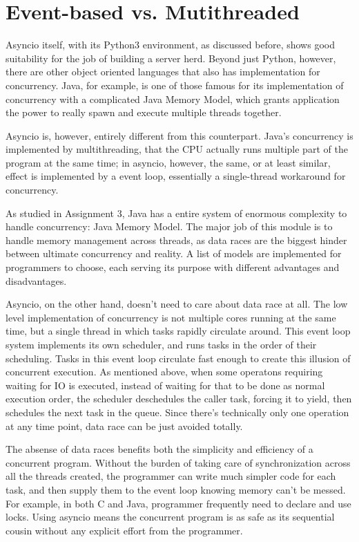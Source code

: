 \documentclass[letterpaper,twocolumn,10pt]{article}
\begin{document}
\section{Event-based vs. Mutithreaded}

Asyncio itself, with its Python3 environment, as discussed before, shows good suitability for the job of building a server herd.
Beyond just Python, however, there are other object oriented languages that also has implementation for concurrency.
Java, for example, is one of those famous for its implementation of concurrency with a complicated Java Memory Model, which grants application the power to really spawn and execute multiple threads together.

Asyncio is, however, entirely different from this counterpart.
Java's concurrency is implemented by multithreading, that the CPU actually runs multiple part of the program at the same time;
in asyncio, however, the same, or at least similar, effect is implemented by a event loop, essentially a single-thread workaround for concurrency.

As studied in Assignment 3, Java has a entire system of enormous complexity to handle concurrency: Java Memory Model. 
The major job of this module is to handle memory management across threads, as data races are the biggest hinder between ultimate concurrency and reality. 
A list of models are implemented for programmers to choose, each serving its purpose with different advantages and disadvantages.

Asyncio, on the other hand, doesn't need to care about data race at all.
The low level implementation of concurrency is not multiple cores running at the same time, but a single thread in which tasks rapidly circulate around.
This event loop system implements its own scheduler, and runs tasks in the order of their scheduling.
Tasks in this event loop circulate fast enough to create this illusion of concurrent execution.
As mentioned above, when some operatons requiring waiting for IO is executed, instead of waiting for that to be done as normal execution order, the scheduler deschedules the caller task, forcing it to yield, then schedules the next task in the queue.
Since there's technically only one operation at any time point, data race can be just avoided totally.

The absense of data races benefits both the simplicity and efficiency of a concurrent program.
Without the burden of taking care of synchronization across all the threads created, the programmer can write much simpler code for each task, and then supply them to the event loop knowing memory can't be messed. 
For example, in both C and Java, programmer frequently need to declare and use locks.
Using asyncio means the concurrent program is as safe as its sequential cousin without any explicit effort from the programmer.
\end{document}
